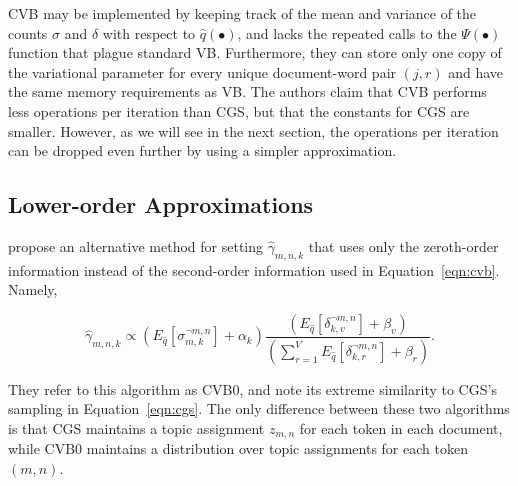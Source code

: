 \documentclass[11pt]{article}
\begin{document}
CVB may be implemented by keeping track of the mean and variance of the
counts $\sigma$ and $\delta$ with respect to $\hat{q}(\bullet)$, and lacks
the repeated calls to the $\Psi(\bullet)$ function that plague standard VB.
Furthermore, they can store only one copy of the variational parameter for
every unique document-word pair $(j,r)$ and have the same memory
requirements as VB. The authors claim that CVB performs less operations per
iteration than CGS, but that the constants for CGS are smaller. However, as
we will see in the next section, the operations per iteration can be
dropped even further by using a simpler approximation.


\subsection{Lower-order Approximations}
\citet{Asuncion:2009:onsmoothing} propose an alternative method for setting
$\hat{\gamma}_{m,n,k}$ that uses only the zeroth-order information instead
of the second-order information used in Equation~\ref{eqn:cvb}. Namely,

\begin{equation}
  \hat{\gamma}_{m,n,k} \propto
  \left(E_{\hat{q}}[\sigma_{m,k}^{\neg m,n}] + \alpha_k\right)
  \frac{\left(E_{\hat{q}}[\delta_{k,v}^{\neg m,n}] + \beta_v\right)}
  {\left(\sum_{r=1}^V E_{\hat{q}}[\delta_{k,r}^{\neg m,n}] +
  \beta_r\right)}.
  \label{eqn:cvb0}
\end{equation}

They refer to this algorithm as CVB0, and note its extreme similarity to
CGS's sampling in Equation~\ref{eqn:cgs}. The only difference between these
two algorithms is that CGS maintains a topic assignment $z_{m,n}$ for each
token in each document, while CVB0 maintains a distribution over topic
assignments for each token $(m,n)$.
\end{document}
